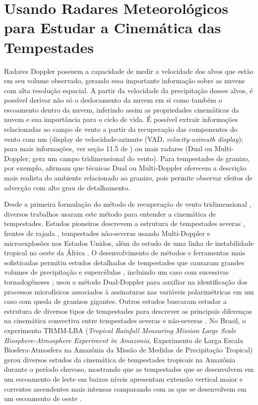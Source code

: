 \section{Usando Radares Meteorológicos para Estudar a Cinemática das Tempestades}

Radares Doppler possuem a capacidade de medir a velocidade dos alvos que estão em seu volume observado, gerando essa importante informação sobre as nuvens com alta resolução espacial. A partir da velocidade da precipitação desses alvos, é possível derivar não só o deslocamento da nuvem em si como também o escoamento dentro da nuvem, inferindo assim as propriedades cinemáticas da nuvem e sua importância para o ciclo de vida. É possível extrair informações relacionadas ao campo de vento a partir da recuperação das componentes do vento com um  (display de velocidade-azimute (VAD, \textit{velocity-azimuth display}); para mais informações, ver seção 11.5 de ) ou mais radares (Dual ou Multi-Doppler; gera um campo tridimensional do vento). Para tempestades de granizo, por exemplo,  afirmam que técnicas Dual ou Multi-Doppler oferecem a descrição mais realista do ambiente relacionado ao granizo, pois permite observar efeitos de advecção com alto grau de detalhamento.

Desde a primeira formulação do método de recuperação de vento tridimensional \cite{Armijo1969}, diversos trabalhos usaram este método para entender a cinemática de tempestades. Estudos pioneiros descrevem a estrutura de tempestades severas \cite{Brandes1977, Ray1980}, frentes de rajada \cite{Weaver1982}, tempestades não-severas usando Multi-Doppler \cite{Ray1978} e microexplosões \cite{Wilson1984} nos Estados Unidos, além do estudo de uma linha de instabilidade tropical no oeste da África \cite{Chong1987}. O desenvolvimento de métodos e ferramentas mais sofisticadas permitiu estudos detalhados de tempestades que causaram grandes volumes de precipitação \cite{Petersen1999a, Calhoun2013} e supercélulas \cite{Potvin2012a, Potvin2012b}, incluindo um caso com sucessivas tornadogêneses \cite{Wurman2007};  usou o método Dual-Doppler para auxiliar na identificação dos processos microfísicos associados à assinaturas nas variáveis polarimétricas em um caso com queda de granizos gigantes. Outros estudos buscaram estudar a estrutura de diversos tipos de tempestades para descrever as principais diferenças na cinemática convectiva entre tempestades severas e não-severas \cite{Lang2002, Deierling2008}. No Brasil, o experimento TRMM-LBA (\textit{Tropical Rainfall Measuring Mission Large Scale Biosphere-Atmosphere Experiment in Amazonia}, Experimento de Larga Escala Biosfera-Atmosfera na Amazônia da Missão de Medidas de Precipitação Tropical) gerou diversos estudos da cinemática de tempestades tropicais na Amazônia durante o período chuvoso, mostrando que as tempestades que se desenvolvem em um escoamento de leste em baixos níveis apresentam extensão vertical maior e correntes ascendentes mais intensas comparando com as que se desenvolvem em um escoamento de oeste \cite{Rutledge2000, Cifelli2002b, Cifelli2004a}.

